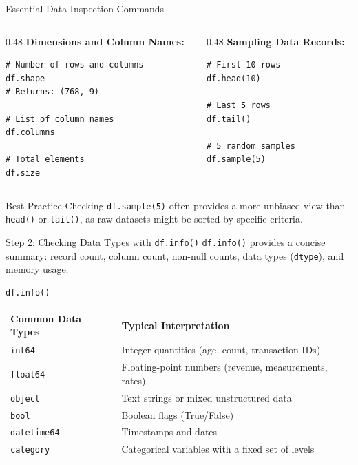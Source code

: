 \documentclass[aspectratio=169,11pt]{beamer}
\newcommand{\code}[1]{\texttt{#1}}
\newcommand{\smallgap}{\vspace{0.35em}}
\begin{document}
\begin{frame}[fragile]{Essential Data Inspection Commands}
\begin{columns}[T]
\begin{column}{0.48\textwidth}
\textbf{Dimensions and Column Names:}
\begin{lstlisting}[style=pythonstyle]
# Number of rows and columns
df.shape
# Returns: (768, 9)

# List of column names
df.columns

# Total elements
df.size
\end{lstlisting}
\end{column}
\begin{column}{0.48\textwidth}
\textbf{Sampling Data Records:}
\begin{lstlisting}[style=pythonstyle]
# First 10 rows
df.head(10)

# Last 5 rows
df.tail()

# 5 random samples
df.sample(5)
\end{lstlisting}
\end{column}
\end{columns}

\smallgap
\begin{block}{Best Practice}
Checking \code{df.sample(5)} often provides a more unbiased view than \code{head()} or \code{tail()}, as raw datasets might be sorted by specific criteria.
\end{block}
\end{frame}

\begin{frame}[fragile]{Step 2: Checking Data Types with \texttt{df.info()}}
\code{df.info()} provides a concise summary: record count, column count, non-null counts, data types (\code{dtype}), and memory usage.

\begin{lstlisting}[style=pythonstyle]
df.info()
\end{lstlisting}

\smallgap
\begin{tabularx}{\textwidth}{lX}
\toprule
\textbf{Common Data Types} & \textbf{Typical Interpretation} \\
\midrule
\code{int64} & Integer quantities (age, count, transaction IDs) \\
\code{float64} & Floating-point numbers (revenue, measurements, rates) \\
\code{object} & Text strings or mixed unstructured data \\
\code{bool} & Boolean flags (True/False) \\
\code{datetime64} & Timestamps and dates \\
\code{category} & Categorical variables with a fixed set of levels \\
\bottomrule
\end{tabularx}
\end{frame}
\end{document}
